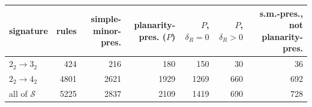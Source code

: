 \begin{tabular}{lrrrrrr}
\toprule
signature & rules & simple-minor-pres. & planarity-pres. ($P$) & $P$, $\delta_R=0$ & $P$, $\delta_R>0$ & s.m.-pres., not planarity-pres.\\
\midrule
$2_2\to3_2$ & 424 & 216 & 180 & 150 & 30 & 36\\
$2_2\to4_2$ & 4801 & 2621 & 1929 & 1269 & 660 & 692\\
\midrule
all of $\mathcal S$ & 5225 & 2837 & 2109 & 1419 & 690 & 728\\
\bottomrule
\end{tabular}
